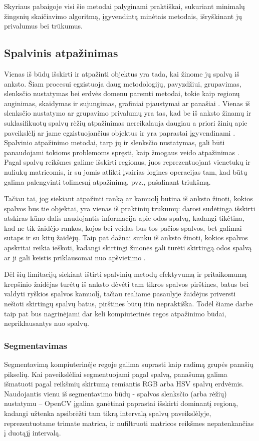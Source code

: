 \documentclass{VUMIFPSbakalaurinis}
\begin{document}
Skyriaus pabaigoje visi šie metodai palyginami praktiškai, sukuriant minimalų žingsnių skaičiavimo algoritmą, įgyvendintą minėtais metodais, išryškinant jų privalumus bei trūkumus. 

\subsection{Spalvinis atpažinimas}
Vienas iš būdų išskirti ir atpažinti objektus yra tada, kai žinome jų spalvą iš anksto. Šiam procesui egzistuoja daug metodologijų, pavyzdžiui, grupavimas, slenksčio nustatymas bei erdvės domenu paremti metodai, tokie kaip regionų auginimas, skaidymas ir sujungimas, grafiniai pjaustymai ar panašiai \cite{segmentation_trends}. Vienas iš slenksčio nustatymo ar grupavimo privalumų yra tas, kad be iš anksto žinamų ir suklasifikuotų spalvų rėžių atpažinimas nereikalauja daugiau a priori žinių apie paveikslėlį ar jame egzistuojančius objektus ir yra paprastai įgyvendinami \cite{segmentation_trends}. Spalvinio atpažinimo metodai, tarp jų ir slenksčio nustatymas, gali būti panaudojami tokioms problemoms spręsti, kaip žmogaus veido atpažinimas \cite{WANG20011983}. Pagal spalvų reikšmes galime išskirti regionus, juos reprezentuojant vienetukų ir nuliukų matricomis, ir su jomis atlikti įvairias logines operacijas tam, kad būtų galima palengvinti tolimesnį atpažinimą, pvz., pašalinant triukšmą. 

Tačiau tai, jog siekiant atpažinti ranką ar kamuolį būtina iš anksto žinoti, kokios spalvos bus tie objektai, yra vienas iš praktinių trūkumų: darosi sudėtinga išskirti atskiras kūno dalis naudojantis informacija apie odos spalvą, kadangi tikėtina, kad ne tik žaidėjo rankos, kojos bei veidas bus tos pačios spalvos, bet galimai sutaps ir su kitų žaidėjų. Taip pat dažnai sunku iš anksto žinoti, kokios spalvos apskritai reikia ieškoti, kadangi skirtingi žmonės gali turėti skirtingą odos spalvą ar ji gali keistis priklausomai nuo apšvietimo \cite{KAKUMANU20071106}. 

Dėl šių limitacijų siekiant ištirti spalvinių metodų efektyvumą ir pritaikomumą krepšinio žaidėjas turėtų iš anksto dėvėti tam tikros spalvos pirštines, batus bei valdyti ryškios spalvos kamuolį, tačiau realiame pasaulyje žaidėjus priversti nešioti skirtingų spalvų batus, pirštines būtų itin nepraktiška. Todėl šiame darbe taip pat bus nagrinėjami dar keli kompiuterinės regos atpažinimo būdai, nepriklausantys nuo spalvų. 

\subsubsection{Segmentavimas}
Segmentavimą kompiuterinėje regoje galima suprasti kaip radimą grupės panašių pikselių. Kai paveikslėliai segmentuojami pagal spalvą, panašumą galima išmatuoti pagal reikšmių skirtumą remiantis RGB arba HSV spalvų erdvėmis. Naudojantis vienu iš segmentavimo būdų - spalvos slenksčio (arba rėžių) nustatymu – OpenCV įgalina ganėtinai paprastai išskirti dominantį regioną, kadangi užtenka apsibrėžti tam tikrą intervalą spalvų paveikslėlyje, reprezentuotame trimate matrica, ir nufiltruoti matricos reikšmes nepatenkančias į duotąjį intervalą. 
\end{document}
